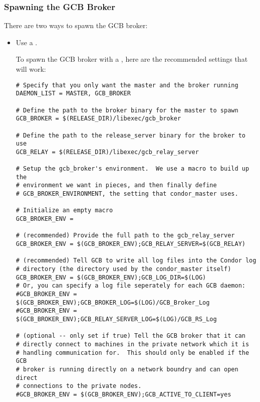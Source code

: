 \subsubsection{\label{sec:GCB-broker-spawn}
Spawning the GCB Broker}

There are two ways to spawn the GCB broker:

\begin{itemize}
\item Use a .

To spawn the GCB broker with a , here are 
the recommended  settings that will work:

\footnotesize
\begin{verbatim}
# Specify that you only want the master and the broker running
DAEMON_LIST = MASTER, GCB_BROKER

# Define the path to the broker binary for the master to spawn
GCB_BROKER = $(RELEASE_DIR)/libexec/gcb_broker

# Define the path to the release_server binary for the broker to use 
GCB_RELAY = $(RELEASE_DIR)/libexec/gcb_relay_server

# Setup the gcb_broker's environment.  We use a macro to build up the
# environment we want in pieces, and then finally define
# GCB_BROKER_ENVIRONMENT, the setting that condor_master uses.

# Initialize an empty macro
GCB_BROKER_ENV =

# (recommended) Provide the full path to the gcb_relay_server
GCB_BROKER_ENV = $(GCB_BROKER_ENV);GCB_RELAY_SERVER=$(GCB_RELAY)

# (recommended) Tell GCB to write all log files into the Condor log
# directory (the directory used by the condor_master itself)
GCB_BROKER_ENV = $(GCB_BROKER_ENV);GCB_LOG_DIR=$(LOG)
# Or, you can specify a log file seperately for each GCB daemon:
#GCB_BROKER_ENV = $(GCB_BROKER_ENV);GCB_BROKER_LOG=$(LOG)/GCB_Broker_Log
#GCB_BROKER_ENV = $(GCB_BROKER_ENV);GCB_RELAY_SERVER_LOG=$(LOG)/GCB_RS_Log

# (optional -- only set if true) Tell the GCB broker that it can
# directly connect to machines in the private network which it is
# handling communication for.  This should only be enabled if the GCB
# broker is running directly on a network boundry and can open direct
# connections to the private nodes.
#GCB_BROKER_ENV = $(GCB_BROKER_ENV);GCB_ACTIVE_TO_CLIENT=yes


\end{verbatim}
\end{itemize}
